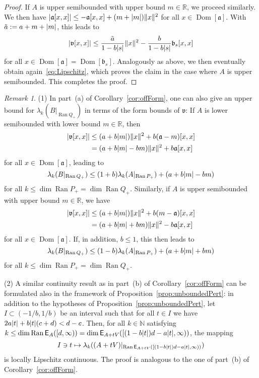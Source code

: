 \documentclass[11pt,a4paper]{amsart}
\numberwithin{equation}{section}
\DeclareMathOperator{\Ran}{Ran}
\DeclareMathOperator{\Dom}{Dom}
\DeclarePairedDelimiter{\abs}{|}{|}
\DeclarePairedDelimiter{\norm}{\lVert}{\rVert}
\newcommand{\NN}{\mathbb{N}}
\newcommand{\RR}{\mathbb{R}}
\newcommand{\EE}{\mathsf{E}}
\newcommand{\fa}{{\mathfrak a}}
\newcommand{\fb}{{\mathfrak b}}
\newcommand{\fv}{{\mathfrak v}}
\theoremstyle{plain}
\theoremstyle{definition}
\theoremstyle{remark}
\newtheorem{remark}[theorem]{Remark}
\begin{document}
\begin{proof}
  If $A$ is upper semibounded with upper bound $m \in \RR$, we proceed similarly. We then have
  $\abs{\fa[x,x]} \le -\fa[x,x] + (m+\abs{m})\norm{x}^2$ for all $x \in \Dom[\fa]$. With $\tilde{a} := a + m + \abs{m}$, this
  leads to
  \begin{equation*}
    \abs{\fv[x,x]}
    \le
    \frac{\tilde{a}}{1-b\abs{s}}\norm{x}^2 - \frac{b}{1-b\abs{s}}\fb_s[x,x]
  \end{equation*}
  for all $x \in \Dom[\fa] = \Dom[\fb_s]$. Analogously as above, we then eventually obtain again~\eqref{eq:Lipschitz}, which
  proves the claim in the case where $A$ is upper semibounded. This completes the proof.
\end{proof}%

\begin{remark}\label{rem:offForm}
  (1)
  In part~(a) of Corollary~\ref{cor:offForm}, one can also give an upper bound for $\lambda_k(B|_{\Ran Q_+})$ in terms of the
  form bounds of $\fv$: If $A$ is lower semibounded with lower bound $m \in \RR$, then
  \begin{align*}
    \abs{ \fv[ x , x ] }
    &\le
    (a + b\abs{m})\norm{x}^2 + b(\fa-m)[ x , x ]\\
    &=
    (a + b\abs{m} - bm)\norm{x}^2 + b\fa[ x , x ]
  \end{align*}
  for all $x \in \Dom[\fa]$, leading to
  \begin{equation*}
    \lambda_k(B|_{\Ran Q_+})
    \le
    (1+b)\lambda_k(A|_{\Ran P_+}) + (a + b\abs{m} - bm)
  \end{equation*}
  for all $k \le \dim\Ran P_+ = \dim\Ran Q_+$. Similarly, if $A$ is upper semibounded with upper bound $m \in \RR$, we have
  \begin{align*}
    \abs{ \fv[ x , x ] }
    &\le
    (a + b\abs{m})\norm{x}^2 + b(m-\fa)[ x , x ]\\
    &=
    (a + b\abs{m} + bm)\norm{x}^2 - b\fa[ x , x ]
  \end{align*}
  for all $x \in \Dom[\fa]$. If, in addition, $b \le 1$, this then leads to
  \begin{equation*}
    \lambda_k(B|_{\Ran Q_+})
    \le
    (1-b)\lambda_k(A|_{\Ran P_+}) + (a + b\abs{m} + bm)
  \end{equation*}
  for all $k \le \dim\Ran P_+ = \dim\Ran Q_+$.

  (2)
  A similar continuity result as in part~(b) of Corollary~\ref{cor:offForm} can be formulated also in the framework of
  Proposition~\ref{prop:unboundedPert}: in addition to the hypotheses of Proposition~\ref{prop:unboundedPert}, let
  $I \subset (-1/b,1/b)$ be an interval such that for all $t \in I$ we have $2a\abs{t} + b\abs{t}(c+d) < d-c$. Then, for all
  $k \in \NN$ satisfying $k \le \dim \Ran \EE_A([d,\infty)) = \dim \EE_{A+tV}([(1-b\abs{t})d-a\abs{t},\infty))$, the mapping
  \begin{equation*}
    I \ni t
    \mapsto
    \lambda_k((A+tV)|_{\Ran\EE_{A+tV}([(1-b\abs{t})d-a\abs{t},\infty))})
  \end{equation*}
  is locally Lipschitz continuous. The proof is analogous to the one of part~(b) of Corollary~\ref{cor:offForm}.


\end{remark}
\end{document}

